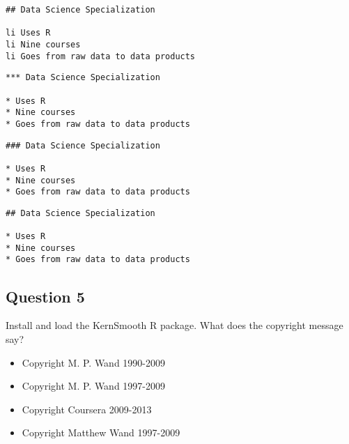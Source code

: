 \documentclass[12pt]{article}
\begin{document}
\begin{verbatim}
## Data Science Specialization 

li Uses R 
li Nine courses 
li Goes from raw data to data products
\end{verbatim}
\begin{verbatim}
*** Data Science Specialization 

* Uses R 
* Nine courses 
* Goes from raw data to data products
\end{verbatim}
\begin{verbatim}
### Data Science Specialization 

* Uses R 
* Nine courses 
* Goes from raw data to data products
\end{verbatim}
\begin{verbatim}
## Data Science Specialization 

* Uses R 
* Nine courses 
* Goes from raw data to data products
\end{verbatim}
\subsection{Question 5}
Install and load the KernSmooth R package. What does the copyright message say?
\begin{itemize}
\item Copyright M. P. Wand 1990-2009
\item Copyright M. P. Wand 1997-2009
\item Copyright Coursera 2009-2013
\item Copyright Matthew Wand 1997-2009
\end{itemize}

\newpage
\end{document}

